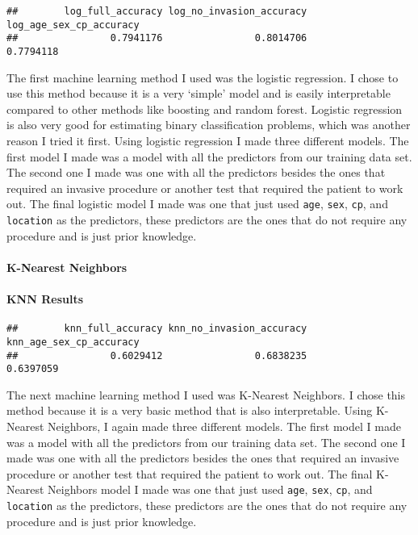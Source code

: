 \documentclass[
]{article}
\begin{document}
\begin{verbatim}
##        log_full_accuracy log_no_invasion_accuracy  log_age_sex_cp_accuracy 
##                0.7941176                0.8014706                0.7794118
\end{verbatim}

The first machine learning method I used was the logistic regression. I
chose to use this method because it is a very `simple' model and is
easily interpretable compared to other methods like boosting and random
forest. Logistic regression is also very good for estimating binary
classification problems, which was another reason I tried it first.
Using logistic regression I made three different models. The first model
I made was a model with all the predictors from our training data set.
The second one I made was one with all the predictors besides the ones
that required an invasive procedure or another test that required the
patient to work out. The final logistic model I made was one that just
used \texttt{age}, \texttt{sex}, \texttt{cp}, and \texttt{location} as
the predictors, these predictors are the ones that do not require any
procedure and is just prior knowledge.

\hypertarget{k-nearest-neighbors}{%
\paragraph{K-Nearest Neighbors}\label{k-nearest-neighbors}}

\hypertarget{knn-results}{%
\paragraph{KNN Results}\label{knn-results}}

\begin{verbatim}
##        knn_full_accuracy knn_no_invasion_accuracy  knn_age_sex_cp_accuracy 
##                0.6029412                0.6838235                0.6397059
\end{verbatim}

The next machine learning method I used was K-Nearest Neighbors. I chose
this method because it is a very basic method that is also
interpretable. Using K-Nearest Neighbors, I again made three different
models. The first model I made was a model with all the predictors from
our training data set. The second one I made was one with all the
predictors besides the ones that required an invasive procedure or
another test that required the patient to work out. The final K-Nearest
Neighbors model I made was one that just used \texttt{age},
\texttt{sex}, \texttt{cp}, and \texttt{location} as the predictors,
these predictors are the ones that do not require any procedure and is
just prior knowledge.
\end{document}
